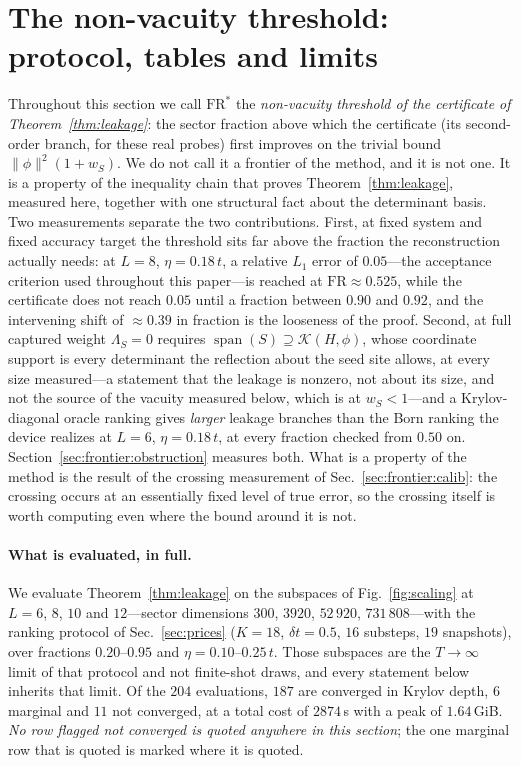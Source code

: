 \section{The non-vacuity threshold: protocol, tables and limits}
\label{sm:frontier}

Throughout this section we call $\mathrm{FR}^{\ast}$ the \emph{non-vacuity threshold of the certificate
of Theorem~\ref{thm:leakage}}: the sector fraction above which the certificate (its second-order branch, for
these real probes) first improves on the trivial bound $\lVert\phi\rVert^{2}(1+w_S)$. We do not call it a frontier of the
method, and it is not one. It is a property of the inequality chain that proves
Theorem~\ref{thm:leakage}, measured here, together with one structural fact about the determinant basis. Two measurements separate the two contributions. First, at
fixed system and fixed accuracy target the threshold sits far above the fraction the reconstruction
actually needs: at $L=8$, $\eta=0.18\,t$, a relative $L_1$ error of $0.05$---the acceptance criterion
used throughout this paper---is reached at $\mathrm{FR}\approx0.525$, while the certificate does not
reach $0.05$ until a fraction between $0.90$ and $0.92$, and the intervening shift of ${\approx}0.39$ in fraction is
the looseness of the proof. Second, at full captured weight $\Lambda_S=0$ requires $\operatorname{span}(S)\supseteq\mathcal K(H,\phi)$, whose coordinate support is every determinant the reflection about the seed site allows, at every size measured---a statement that the leakage is nonzero, not about its size, and not the source of the vacuity measured below, which is at $w_S<1$---and a Krylov-diagonal oracle ranking gives \emph{larger} leakage branches than the Born ranking the device realizes at $L=6$, $\eta=0.18\,t$, at every fraction checked from $0.50$ on.
Section~\ref{sec:frontier:obstruction} measures both. What is a property of the method is
the result of the crossing measurement of Sec.~\ref{sec:frontier:calib}: the crossing occurs at an essentially fixed level of
true error, so the crossing itself is worth computing even where the bound around it is not.

\paragraph{What is evaluated, in full.} We evaluate Theorem~\ref{thm:leakage} on the subspaces of Fig.~\ref{fig:scaling} at $L=6$, $8$, $10$
and $12$---sector dimensions $300$, $3920$, $52\,920$, $731\,808$---with the ranking protocol of
Sec.~\ref{sec:prices} ($K=18$, $\delta t=0.5$, $16$ substeps, $19$ snapshots), over fractions
$0.20$--$0.95$ and $\eta=0.10$--$0.25\,t$. Those subspaces are the $T\to\infty$ limit of that protocol
%
%
and not finite-shot draws, and every statement below inherits that limit. Of the $204$ evaluations, $187$
are converged in Krylov depth, $6$ marginal and $11$ not converged, at a total cost of $2874$\,s with
a peak of $1.64$\,GiB. \emph{No row flagged not converged is quoted anywhere in this section}; the
one marginal row that is quoted is marked where it is quoted.

